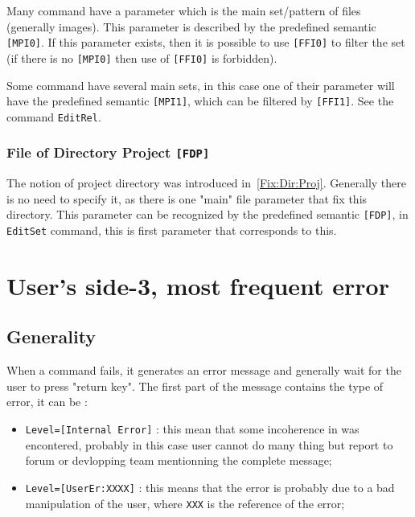 Many command have a parameter which is the main set/pattern of files (generally images).
This  parameter is described by the predefined semantic {\tt [MPI0]}. If this
parameter exists, then  it is possible to use {\tt [FFI0]} to filter the set (if there
is no {\tt [MPI0]} then use of {\tt [FFI0]}  is forbidden).

Some command have several main sets, in this case one of their parameter will have
the predefined semantic {\tt [MPI1]}, which can be filtered by {\tt [FFI1]}. See
the command {\tt EditRel}.



\subsubsection{File of Directory Project {\tt [FDP]}}

The notion of project directory was introduced in~\ref{Fix:Dir:Proj}.
Generally there is no need to specify it, as there is one "main" file parameter
that fix this directory. This parameter can be recognized by the predefined
semantic  {\tt [FDP]}, in {\tt EditSet} command, this is first parameter that
corresponds to this.





\section{User's side-3, most frequent error}



\subsection{Generality}

When a command fails, it generates an error message and generally wait for 
the user to press "return key".
The first part of the message contains the type of error, it can be :

\begin{itemize}
   \item {\tt Level=[Internal Error]} : this mean that some incoherence in \PPP was encontered,
         probably in this case user cannot do many thing but report to forum or devlopping team
         mentionning the complete message;

   \item {\tt Level=[UserEr:XXXX]} : this means that the error is probably due to a bad
        manipulation of the user, where {\tt XXX}  is the reference of the error;
\end{itemize}

